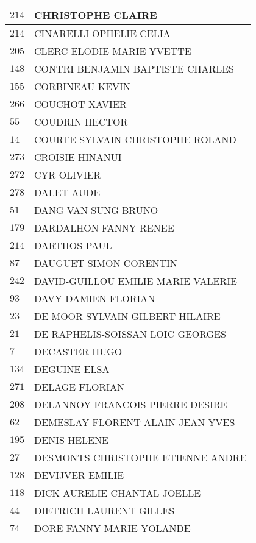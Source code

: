 \begin{xltabular}{\linewidth}{|l|X|}
    \hline
    $214$ & CHRISTOPHE CLAIRE \\
    \hline
    $214$ & CINARELLI OPHELIE CELIA \\
    \hline
    $205$ & CLERC ELODIE MARIE YVETTE \\
    \hline
    $148$ & CONTRI BENJAMIN BAPTISTE CHARLES \\
    \hline
    $155$ & CORBINEAU KEVIN \\
    \hline
    $266$ & COUCHOT XAVIER \\
    \hline
    $55$ & COUDRIN HECTOR \\
    \hline
    $14$ & COURTE SYLVAIN CHRISTOPHE ROLAND \\
    \hline
    $273$ & CROISIE HINANUI \\
    \hline
    $272$ & CYR OLIVIER \\
    \hline
    $278$ & DALET AUDE \\
    \hline
    $51$ & DANG VAN SUNG BRUNO \\
    \hline
    $179$ & DARDALHON FANNY RENEE \\
    \hline
    $214$ & DARTHOS PAUL \\
    \hline
    $87$ & DAUGUET SIMON CORENTIN \\
    \hline
    $242$ & DAVID-GUILLOU EMILIE MARIE VALERIE \\
    \hline
    $93$ & DAVY DAMIEN FLORIAN \\
    \hline
    $23$ & DE MOOR SYLVAIN GILBERT HILAIRE \\
    \hline
    $21$ & DE RAPHELIS-SOISSAN LOIC GEORGES \\
    \hline
    $7$ & DECASTER HUGO \\
    \hline
    $134$ & DEGUINE ELSA \\
    \hline
    $271$ & DELAGE FLORIAN \\
    \hline
    $208$ & DELANNOY FRANCOIS PIERRE DESIRE \\
    \hline
    $62$ & DEMESLAY FLORENT ALAIN JEAN-YVES \\
    \hline
    $195$ & DENIS HELENE \\
    \hline
    $27$ & DESMONTS CHRISTOPHE ETIENNE ANDRE \\
    \hline
    $128$ & DEVIJVER EMILIE \\
    \hline
    $118$ & DICK AURELIE CHANTAL JOELLE \\
    \hline
    $44$ & DIETRICH LAURENT GILLES \\
    \hline
    $74$ & DORE FANNY MARIE YOLANDE \\

\end{xltabular}
